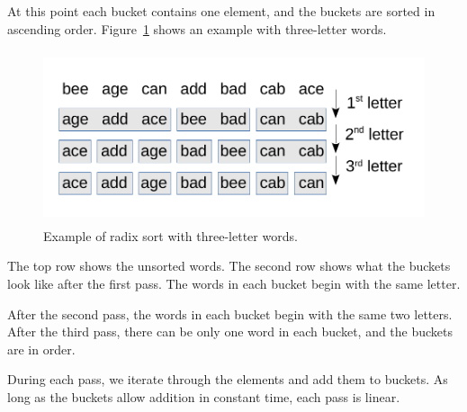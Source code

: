 \documentclass[12pt]{book}
\theoremstyle{exercise}
\newcommand{\java}{\verb}%}
\begin{document}

At this point each bucket contains one element, and the buckets are
sorted in ascending order. Figure~\ref{fig-sort3}
shows an example with
three-letter words.

\begin{figure}
\centering
\includegraphics[height=2.0in]{figs/radix_sort1.pdf}
\caption{Example of radix sort with three-letter words.}
\label{fig-sort3}
\end{figure}

The top row shows the unsorted words. The second row shows what the
buckets look like after the first pass. The words in each bucket begin
with the same letter.

After the second pass, the words in each bucket begin with the same two
letters. After the third pass, there can be only one word in each
bucket, and the buckets are in order.

During each pass, we iterate through the elements and add them to
buckets. As long as the buckets allow addition in constant time, each
pass is linear.

\end{document}
